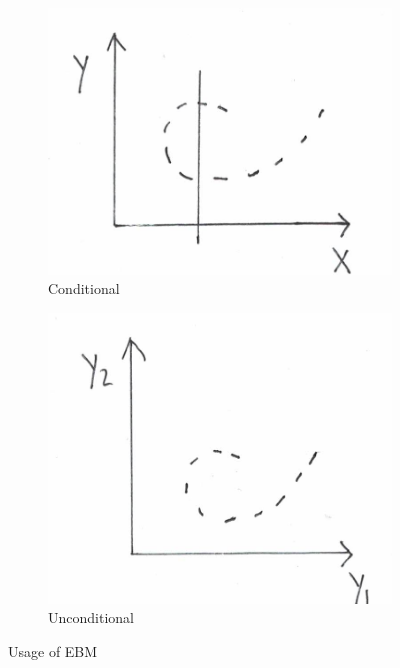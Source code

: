 \begin{figure}[htb]
    \centering
    \begin{subfigure}[b]{0.3\textwidth}
        \includegraphics[width=\textwidth]{lectures/07-b/images/3.png}
        \caption{Conditional}
        \label{fig:conditionalexample1}
    \end{subfigure}
    \begin{subfigure}[b]{0.29\textwidth}
        \includegraphics[width=\textwidth]{lectures/07-b/images/4.png}
        \caption{Unconditional}
        \label{fig:unconditionalexample1}
    \end{subfigure}
    \caption{Usage of EBM}\label{fig:Example1}
\end{figure}


